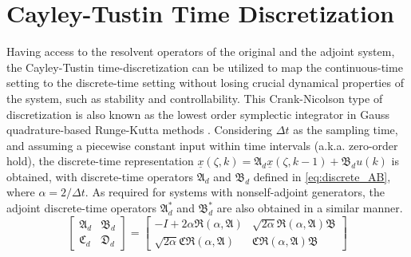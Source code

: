 \section{Cayley-Tustin Time Discretization}
Having access to the resolvent operators of the original and the adjoint system, the Cayley-Tustin time-discretization can be utilized to map the continuous-time setting to the discrete-time setting without losing crucial dynamical properties of the system, such as stability and controllability. This Crank-Nicolson type of discretization is also known as the lowest order symplectic integrator in Gauss quadrature-based Runge-Kutta methods \cite{hairer2006geometric}. Considering $\Delta t$ as the sampling time, and assuming a piecewise constant input within time intervals (a.k.a. zero-order hold), the discrete-time representation $\underline{x}(\zeta, k) = \mathfrak{A}_d \underline{x}(\zeta, k-1) + \mathfrak{B}_d u(k)$ is obtained, with discrete-time operators $\mathfrak{A}_d$ and $\mathfrak{B}_d$ defined in \eqref{eq:discrete_AB}, where $\alpha = 2/{\Delta t}$. As required for systems with nonself-adjoint generators, the adjoint discrete-time operators $\mathfrak{A}_d^*$ and $\mathfrak{B}_d^*$ are also obtained in a similar manner.
\begin{equation} \label{eq:discrete_AB}
    \begin{bmatrix}
        \mathfrak{A}_d & \mathfrak{B}_d \\
        \mathfrak{C}_d & \mathfrak{D}_d
    \end{bmatrix} = 
    \begin{bmatrix}
        -I + 2\alpha \mathfrak{R}(\alpha, \mathfrak{A}) & \sqrt{2\alpha} \mathfrak{R}(\alpha, \mathfrak{A}) \mathfrak{B}\\
        \sqrt{2\alpha} \mathfrak{C} \mathfrak{R}(\alpha, \mathfrak{A}) & \mathfrak{C} \mathfrak{R}(\alpha, \mathfrak{A}) \mathfrak{B}
    \end{bmatrix}
\end{equation}
